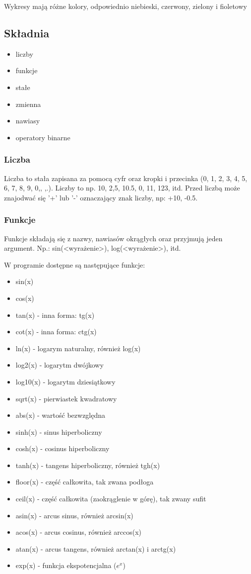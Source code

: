 \documentclass[a4paper]{article}
\begin{document}
Wykresy mają różne kolory, odpowiednio niebieski, czerwony, zielony i fioletowy
\subsection{Składnia}
\begin{itemize}
    \item liczby
    \item funkcje
    \item stałe
    \item zmienna
    \item nawiasy
    \item operatory binarne
\end{itemize}

\subsubsection{Liczba}

Liczba to stała zapisana za pomocą cyfr oraz kropki i przecinka ({0, 1, 2, 3, 4, 5, 6, 7, 8, 9, 0,, ,.}). Liczby to np. 10, 2,5, 10.5, 0, 11, 123, itd.
Przed liczbą może znajodwać się '+' lub '-' oznaczający znak liczby, np: +10, -0.5.

\subsubsection{Funkcje}

Funkcje składają się z nazwy, nawiasów okrągłych oraz przyjmują jeden argument. Np.: sin(<wyrażenie>), log(<wyrażenie>), itd.

W programie dostępne są następujące funkcje:
\begin{itemize}
    \item sin(x)
    \item cos(x)
    \item tan(x) - inna forma: tg(x)
    \item cot(x) - inna forma: ctg(x)
    \item ln(x) - logarym naturalny, również log(x)
    \item log2(x) - logarytm dwójkowy
    \item log10(x) - logarytm dziesiątkowy
    \item sqrt(x) - pierwiastek kwadratowy
    \item abs(x) - wartość bezwzględna
    \item sinh(x) - sinus hiperboliczny
    \item cosh(x) - cosinus hiperboliczny
    \item tanh(x) - tangens hiperboliczny, również tgh(x)
    \item floor(x) - część całkowita, tak zwana podłoga
    \item ceil(x) - część całkowita (zaokrąglenie w górę), tak zwany sufit
    \item asin(x) - arcus sinus, również arcsin(x)
    \item acos(x) - arcus cosinus, również arccos(x)
    \item atan(x) - arcus tangens, również arctan(x) i arctg(x)
    \item exp(x) - funkcja ekspotencjalna ($e^x$)
\end{itemize}
\end{document}
